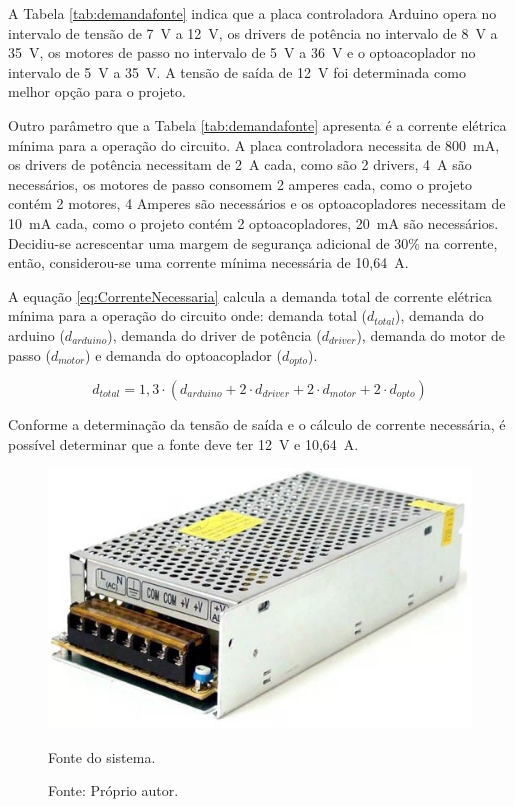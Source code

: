 A Tabela \ref{tab:demandafonte} indica que a placa controladora Arduino opera no intervalo de tensão de 7~V 
a 12~V, os drivers de potência no intervalo de 8~V a 35~V, os motores de passo no intervalo de 5~V a 36~V 
e o optoacoplador no intervalo de 5~V a 35~V. A tensão de saída de 12~V foi determinada como melhor 
opção para o projeto.

Outro parâmetro que a Tabela \ref{tab:demandafonte} apresenta é a corrente elétrica mínima para a operação 
do circuito. A placa controladora necessita de 800~mA, os drivers de potência necessitam de 2~A cada, 
como são 2 drivers, 4~A são necessários, os motores de passo consomem 2 amperes cada, como o projeto 
contém 2 motores, 4 Amperes são necessários e os optoacopladores necessitam de 10~mA cada, como o 
projeto contém 2 optoacopladores, 20~mA são necessários. Decidiu-se acrescentar uma margem de 
segurança adicional de 30\% na corrente, então, considerou-se uma corrente mínima necessária de 10,64~A.

A equação \ref{eq:CorrenteNecessaria} calcula a demanda total de 
corrente elétrica mínima para a operação do circuito onde:
demanda total ($d_{total}$), demanda do arduino ($d_{arduino}$), demanda do driver de potência ($d_{driver}$),
demanda do motor de passo ($d_{motor}$) e demanda do optoacoplador ($d_{opto}$).

\begin{equation}\label{eq:CorrenteNecessaria}
    d_{total} = 1,3 \cdot (d_{arduino} + 2 \cdot d_{driver} + 2 \cdot d_{motor} + 2 \cdot d_{opto})    
\end{equation}

Conforme a determinação da tensão de saída e o cálculo de corrente necessária, 
é possível determinar que a fonte deve ter 12~V e 10,64~A.

\begin{figure}[H]
\centering
\includegraphics[scale = 0.6]{figuras/fonte}
\caption{Fonte do sistema.}
\caption*{Fonte: Próprio autor.}
\label{fig:fonte}
\end{figure}
    
